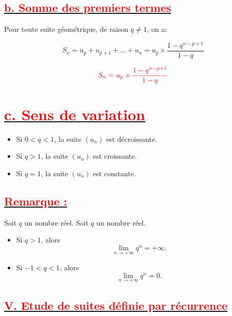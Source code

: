 \documentclass[12pt,a4paper]{article}
\begin{document}
\subsection*{\underline{\textbf{\textcolor{red}{b. Somme des premiers termes }}}}

Pour toute suite géométrique, de raison $q\neq 1$, on a:

%

$$S_{n}=u_{p}+u_{p+1}+\ldots+u_{n}=u_{p}\times\dfrac{1-q^{n-p+1}}{1-q}$$

\begin{mdframed}[linecolor=red] %
    \[
    \color{red} S_{n}=u_{p}\times\dfrac{1-q^{n-p+1}}{1-q}
    \]
\end{mdframed}
\section*{\underline{\textbf{\textcolor{red}{c. Sens de variation}}}}
    \begin{itemize}
        \item Si $0 < q < 1$, la suite $\left(u_{n}\right)$ est décroissante.
        \item Si $q > 1$, la suite $\left(u_{n}\right)$ est croissante.
        \item Si $q=1$, la suite $\left(u_{n}\right)$ est constante.
    \end{itemize}


\subsection*{\underline{\textbf{\textcolor{red}{Remarque :}}}}
Soit $q$ un nombre réel.
Soit \( q \) un nombre réel.

\begin{itemize}
    \item Si \( q > 1 \), alors
    \[
    \lim_{n \rightarrow +\infty} q^n = +\infty.
    \]
    
    \item Si \( -1 < q < 1 \), alors
    \[
    \lim_{n \rightarrow +\infty} q^n = 0.
    \]
\end{itemize}
\subsection*{\underline{\textbf{\textcolor{red}{V. Etude de suites définie par récurrence}}}}
\end{document}
